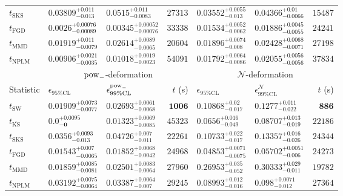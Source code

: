 \begin{tabular}{l|llr|llr}
	$t_{\mathrm{SKS}}$ & $0.03809_{-0.013}^{+0.011}$ & $0.0515_{-0.0083}^{+0.011}$ & $27313$ & $0.03552_{-0.013}^{+0.0055}$ & $0.04366_{-0.0066}^{+0.01}$ & $15487$ \\
	$t_{\mathrm{FGD}}$ & ${\mathbf{0.0026_{-0.00089}^{+0.00076}}}$ & ${\mathbf{0.00345_{-0.00076}^{+0.00052}}}$ & $33338$ & $0.01534_{-0.0062}^{+0.0052}$ & $0.01886_{-0.0055}^{+0.0045}$ & $24241$ \\
	$t_{\mathrm{MMD}}$ & $0.01919_{-0.0079}^{+0.011}$ & $0.02614_{-0.0065}^{+0.0089}$ & $20604$ & $0.01896_{-0.008}^{+0.0074}$ & $0.02428_{-0.0071}^{+0.0068}$ & $27198$ \\
\rowcolor{red!35}	$t_{\mathrm{NPLM}}$ & $0.00906_{-0.0035}^{+0.0021}$ & $0.01018_{-0.0023}^{+0.0019}$ & $54091$ & $0.01792_{-0.0086}^{+0.0064}$ & $0.02055_{-0.0056}^{+0.0056}$ & $37834$ \\
	\toprule
	\multicolumn{1}{c}{} & \multicolumn{3}{c}{$\rm{pow}_{-}$-deformation} & \multicolumn{3}{c}{$\mathcal{N}$-deformation} \\
	Statistic & $\epsilon_{95\%\mathrm{CL}}$ & $\epsilon^  {\rm{pow}_{-}}_{99\%\mathrm{CL}}$ & $t$ (s) & $\epsilon_{95\%\mathrm{CL}}$ & $\epsilon^    {\mathcal{N}}_{99\%\mathrm{CL}}$ & $t$ (s) \\
	\midrule
	$t_{\mathrm{SW}}$ & $0.01909_{-0.0077}^{+0.0073}$ & $0.02693_{-0.0068}^{+0.0061}$ & ${\mathbf{1006}}$ & $0.10868_{-0.017}^{+0.02}$ & $0.1277_{-0.022}^{+0.011}$ & ${\mathbf{886}}$ \\
	$t_{\overline{\mathrm{KS}}}$ & ${\mathbf{0.0_{-0}^{+0.0095}}}$ & ${\mathbf{0.01323_{-0.0085}^{+0.0069}}}$ & $45323$ & $0.0656_{-0.049}^{+0.016}$ & $0.08707_{-0.019}^{+0.013}$ & $22186$ \\
	$t_{\mathrm{SKS}}$ & $0.0356_{-0.013}^{+0.0093}$ & $0.04726_{-0.011}^{+0.007}$ & $22261$ & $0.10733_{-0.017}^{+0.022}$ & $0.13357_{-0.026}^{+0.016}$ & $24344$ \\
	$t_{\mathrm{FGD}}$ & $0.01543_{-0.0065}^{+0.007}$ & $0.01852_{-0.0042}^{+0.0068}$ & $24968$ & ${\mathbf{0.04853_{-0.0075}^{+0.0071}}}$ & ${\mathbf{0.05702_{-0.006}^{+0.0051}}}$ & $24273$ \\
	$t_{\mathrm{MMD}}$ & $0.01859_{-0.0081}^{+0.0085}$ & $0.02501_{-0.0064}^{+0.0083}$ & $27960$ & $0.26953_{-0.052}^{+0.035}$ & $0.30333_{-0.011}^{+0.029}$ & $19782$ \\
\rowcolor{red!35}	$t_{\mathrm{NPLM}}$ & $0.03192_{-0.0064}^{+0.0075}$ & $0.03387_{-0.007}^{+0.0064}$ & $29245$ & $0.08993_{-0.016}^{+0.012}$ & $0.098_{-0.012}^{+0.0071}$ & $27364$ \\

\end{tabular}
